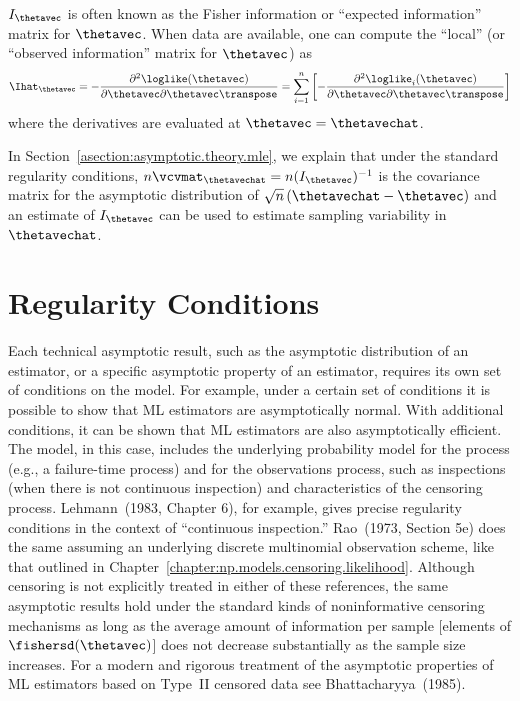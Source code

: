 $I_{\thetavec}$ is often known as the Fisher information
or ``expected information'' matrix for $\thetavec$.  
When data are available,
one can compute the ``local'' 
(or ``observed information'' matrix for $\thetavec$)
as
\begin{equation}
\label{equation:observed.information}
     \Ihat_{\thetavec}=
    -\frac{\partial ^2 \loglike(\thetavec)}{\partial \thetavec
      \partial \thetavec \transpose}
=
\sum^{n}_{i=1} \left [-\frac{\partial ^2
\loglike_{i}(\thetavec)}{\partial \thetavec
\partial \thetavec \transpose}\right ]
\end{equation}
where the derivatives are evaluated at $\thetavec=\thetavechat$. 

In Section~\ref{asection:asymptotic.theory.mle}, we explain that
under the standard
regularity conditions,
$n \vcvmat_{\thetavechat}=n  (I_{\thetavec})^{-1}$
is the covariance matrix for the 
asymptotic distribution of 
$\sqrt{n} \,(\thetavechat-\thetavec)$
and an estimate of $I_{\thetavec}$ can be used
to estimate sampling variability in $\thetavechat$.

\section{Regularity Conditions}
\label{asection:regularity.conditions}
Each technical asymptotic result, such as the asymptotic
distribution of an estimator, or a specific asymptotic property of
an estimator, requires its own set of conditions on the model.  For
example, under a certain set of conditions it is possible to show
that ML estimators are asymptotically normal. With additional
conditions, it can be shown that ML estimators are also
asymptotically efficient. The model, in this case, includes the
underlying probability model for the process (e.g., a failure-time
process) and for the observations process, such as inspections (when
there is not continuous inspection) and characteristics of the
censoring process.  Lehmann~(1983, Chapter 6), for example, gives
precise regularity conditions in the context of ``continuous
inspection.''  Rao~(1973, Section 5e) does the same assuming an
underlying discrete multinomial observation scheme, like that
outlined in Chapter~\ref{chapter:np.models.censoring.likelihood}.
Although censoring is not explicitly treated in either of these
references, the same asymptotic results hold under the standard
kinds of noninformative censoring mechanisms as long as the average
amount of information per sample [elements of
$\fishersd(\thetavec)$] does not decrease substantially as the
sample size increases.  For a modern and rigorous treatment of the
asymptotic properties of ML estimators based on Type~II censored
data see Bhattacharyya~(1985).

